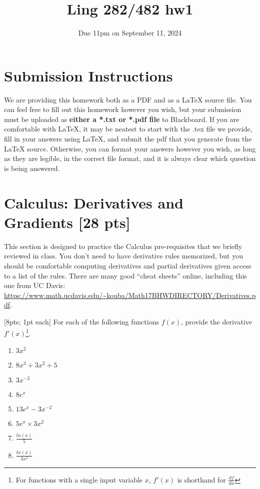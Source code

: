 \documentclass[11pt]{article}
\begin{document}
\title{Ling 282/482 hw1}
\date{\vspace{-0.2in}Due 11pm on September 11, 2024}
\maketitle

\section*{Submission Instructions}
We are providing this homework both as a PDF and as a LaTeX source file. You can feel free to fill out this homework however you wish, but your submission must be uploaded as \textbf{either a *.txt or *.pdf file} to Blackboard. If you are comfortable with LaTeX, it may be neatest to start with the .tex file we provide, fill in your answers using LaTeX, and submit the pdf that you generate from the LaTeX source. Otherwise, you can format your answers however you wish, as long as they are legible, in the correct file format, and it is always clear which question is being answered.

\section{Calculus: Derivatives and Gradients [28 pts]}

This section is designed to practice the Calculus pre-requisites that we briefly reviewed in class. You don't need to have derivative rules memorized, but you should be comfortable computing derivatives and partial derivatives given access to a list of the rules. There are many good ``cheat sheets'' online, including this one from UC Davis: \url{https://www.math.ucdavis.edu/~kouba/Math17BHWDIRECTORY/Derivatives.pdf}.

\vspace{2em}
 [8pts; 1pt each] For each of the following functions $f(x)$, provide the derivative $f'(x)$\footnote{For functions with a single input variable $x$, $f'(x)$ is shorthand for $\frac{df}{dx}$}.

\begin{enumerate}[label=\alph*.]
    \setlength\itemsep{1em}
    \item $3x^2$
    \item $8x^3 + 3x^2 + 5$
    \item $3x^{-2}$
    \item $8e^x$
    \item $13e^x - 3x^{-2}$
    \item $5e^x \times 3x^2$
    \item $\frac{ln(x)}{5}$
    \item $\frac{ln(x)}{3x^2}$
\end{enumerate}
\end{document}
